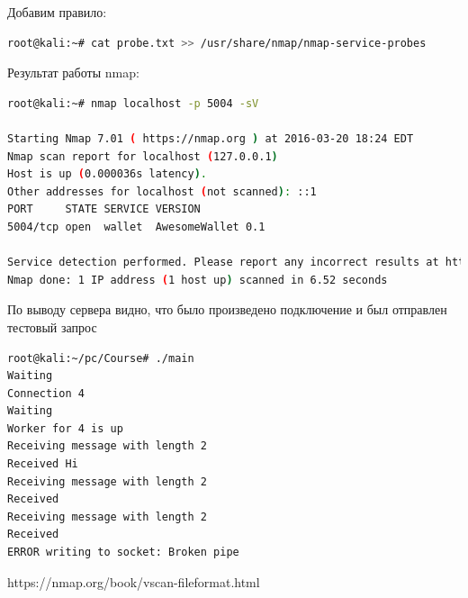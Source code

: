 Добавим правило:

\begin{lstlisting}[language=bash]
root@kali:~# cat probe.txt >> /usr/share/nmap/nmap-service-probes
\end{lstlisting}

Результат работы nmap:

\begin{lstlisting}[language=bash]
root@kali:~# nmap localhost -p 5004 -sV

Starting Nmap 7.01 ( https://nmap.org ) at 2016-03-20 18:24 EDT
Nmap scan report for localhost (127.0.0.1)
Host is up (0.000036s latency).
Other addresses for localhost (not scanned): ::1
PORT     STATE SERVICE VERSION
5004/tcp open  wallet  AwesomeWallet 0.1

Service detection performed. Please report any incorrect results at https://nmap.org/submit/ .
Nmap done: 1 IP address (1 host up) scanned in 6.52 seconds
\end{lstlisting}

По выводу сервера видно, что было произведено подключение и был отправлен тестовый запрос

\begin{lstlisting}[language=bash]
root@kali:~/pc/Course# ./main 
Waiting
Connection 4
Waiting
Worker for 4 is up
Receiving message with length 2
Received Hi
Receiving message with length 2
Received 
Receiving message with length 2
Received 
ERROR writing to socket: Broken pipe
\end{lstlisting}

https://nmap.org/book/vscan-fileformat.html